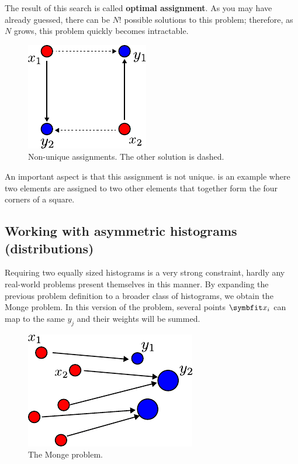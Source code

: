 The result of this search is called \textbf{optimal assignment}. As you may have already guessed, there can be $N!$ possible solutions to this problem; therefore, as $N$ grows, this problem quickly becomes intractable.

\begin{figure}
    \centering
    \includegraphics{chapters/assets/ot/monge1.pdf}
    \caption{Non-unique assignments. The other solution is dashed.}
    \label{fig:ot-non-uniq}
\end{figure}

An important aspect is that this assignment is not unique.  is an example where two elements are assigned to two other elements that together form the four corners of a square.

\subsection{Working with asymmetric histograms (distributions)}\label{ssec:ot-assym}

Requiring two equally sized histograms is a very strong constraint, hardly any real-world problems present themselves in this manner. By expanding the previous problem definition to a broader class of histograms, we obtain the Monge problem. In this version of the problem, several points $\bfitx_i$ can map to the same $y_j$ and their weights will be summed.

\begin{figure}[ht]
    \centering
    \includegraphics{chapters/assets/ot/monge2.pdf}
    \caption{The Monge problem.}
    \label{fig:ot-assym}
\end{figure}

